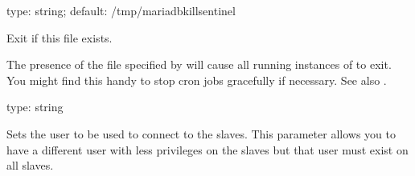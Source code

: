 \documentclass[letterpaper,10pt,english]{sphinxmanual}
\begin{document}

\begin{fulllineitems}
\label{\detokenize{mariadb-kill:cmdoption-mariadb-kill-sentinel}}
\sphinxAtStartPar
type: string; default: /tmp/mariadb\sphinxhyphen{}kill\sphinxhyphen{}sentinel

\sphinxAtStartPar
Exit if this file exists.

\sphinxAtStartPar
The presence of the file specified by {\hyperref[\detokenize{mariadb-kill:cmdoption-mariadb-kill-sentinel}]{}} will cause all
running instances of  to exit.  You might find this handy to stop cron
jobs gracefully if necessary.  See also {\hyperref[\detokenize{mariadb-kill:cmdoption-mariadb-kill-stop}]{}}.

\end{fulllineitems}


\begin{fulllineitems}
\label{\detokenize{mariadb-kill:cmdoption-mariadb-kill-slave-user}}
\sphinxAtStartPar
type: string

\sphinxAtStartPar
Sets the user to be used to connect to the slaves.
This parameter allows you to have a different user with less privileges on the
slaves but that user must exist on all slaves.

\end{fulllineitems}
\end{document}
